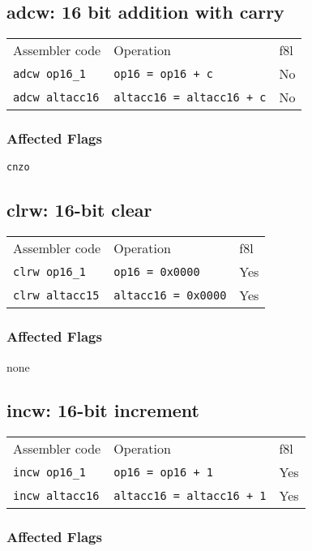 \documentclass{book}
\begin{document}
\subsection{adcw: 16 bit addition with carry}

\begin{tabular}{l l l}
Assembler code         & Operation                        & f8l \\
\texttt{adcw op16\_1}  & \texttt{op16 = op16 + c}         & No \\
\texttt{adcw altacc16} & \texttt{altacc16 = altacc16 + c} & No
\end{tabular}

\subsubsection*{Affected Flags}

\texttt{cnzo}


\subsection{clrw: 16-bit clear}

\begin{tabular}{l l l}
Assembler code         & Operation                  & f8l \\
\texttt{clrw op16\_1}  & \texttt{op16 = 0x0000}     & Yes \\
\texttt{clrw altacc15} & \texttt{altacc16 = 0x0000} & Yes
\end{tabular}

\subsubsection*{Affected Flags}

none


\subsection{incw: 16-bit increment}

\begin{tabular}{l l l}
Assembler code         & Operation                        & f8l \\
\texttt{incw op16\_1}  & \texttt{op16 = op16 + 1}         & Yes \\
\texttt{incw altacc16} & \texttt{altacc16 = altacc16 + 1} & Yes
\end{tabular}

\subsubsection*{Affected Flags}
\end{document}
